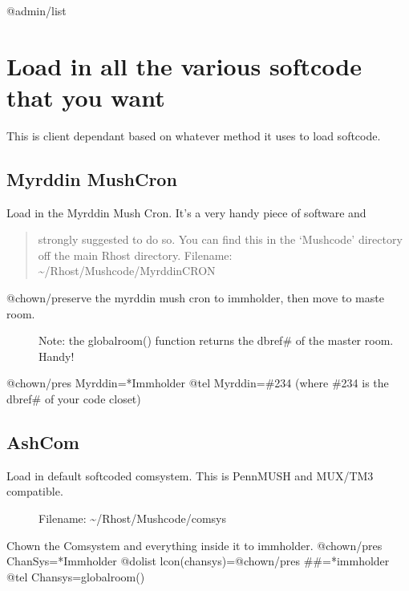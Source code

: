 \documentclass[letterpaper,10pt,english]{sphinxmanual}
\begin{document}
\sphinxAtStartPar
@admin/list


\section{Load in all the various softcode that you want}
\label{\detokenize{05-newmush:load-in-all-the-various-softcode-that-you-want}}
\sphinxAtStartPar
This is client dependant based on whatever method it uses to load softcode.


\subsection{Myrddin MushCron}
\label{\detokenize{05-newmush:myrddin-mushcron}}
\sphinxAtStartPar
Load in the Myrddin Mush Cron.
It’s a very handy piece of software and
\begin{quote}

\sphinxAtStartPar
strongly suggested to do so.  You can find this in the ‘Mushcode’ directory
off the main Rhost directory.
Filename: \textasciitilde{}/Rhost/Mushcode/MyrddinCRON
\end{quote}
\begin{description}
\item[{@chown/preserve the myrddin mush cron to immholder, then move to maste room.}] \leavevmode
\sphinxAtStartPar
Note: the globalroom() function returns the dbref\# of the master room.  Handy!

\end{description}

\sphinxAtStartPar
@chown/pres Myrddin=*Immholder
@tel Myrddin=\#234 (where \#234 is the dbref\# of your code closet)


\subsection{AshCom}
\label{\detokenize{05-newmush:ashcom}}\begin{description}
\item[{Load in default softcoded comsystem.  This is PennMUSH and MUX/TM3 compatible.}] \leavevmode
\sphinxAtStartPar
Filename: \textasciitilde{}/Rhost/Mushcode/comsys

\end{description}

\sphinxAtStartPar
Chown the Comsystem and everything inside it to immholder.
@chown/pres ChanSys=*Immholder
@dolist lcon(chansys)=@chown/pres \#\#=*immholder
@tel Chansys=globalroom()
\end{document}
